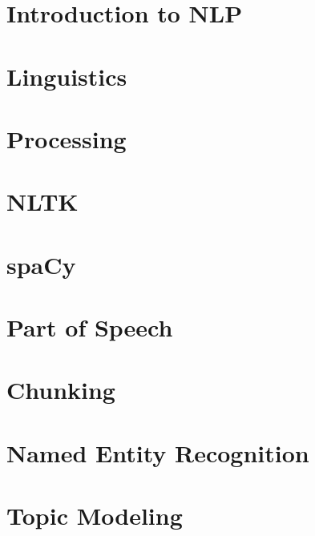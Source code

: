 \section[Intro]{Introduction to NLP}


\section[Ling]{Linguistics}

\section[Pre]{Processing}

\section[NLTK]{NLTK}


\section[spaCy]{spaCy}


\section[POS]{Part of Speech}





\section[Chunk]{Chunking}



\section[NER]{Named Entity Recognition}







\section[Topics]{Topic Modeling}


